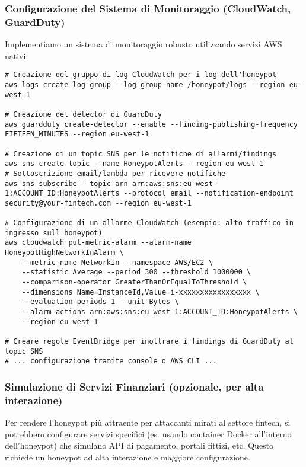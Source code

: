 \subsubsection{Configurazione del Sistema di Monitoraggio (CloudWatch, GuardDuty)}
\label{subsubsec:config_monitoraggio}

Implementiamo un sistema di monitoraggio robusto utilizzando servizi AWS nativi.

\begin{lstlisting}[caption={Configurazione (esemplificativa) del monitoraggio AWS}, label=lst:monitoring_setup]
# Creazione del gruppo di log CloudWatch per i log dell'honeypot
aws logs create-log-group --log-group-name /honeypot/logs --region eu-west-1

# Creazione del detector di GuardDuty
aws guardduty create-detector --enable --finding-publishing-frequency FIFTEEN_MINUTES --region eu-west-1

# Creazione di un topic SNS per le notifiche di allarmi/findings
aws sns create-topic --name HoneypotAlerts --region eu-west-1
# Sottoscrizione email/lambda per ricevere notifiche
aws sns subscribe --topic-arn arn:aws:sns:eu-west-1:ACCOUNT_ID:HoneypotAlerts --protocol email --notification-endpoint security@your-fintech.com --region eu-west-1

# Configurazione di un allarme CloudWatch (esempio: alto traffico in ingresso sull'honeypot)
aws cloudwatch put-metric-alarm --alarm-name HoneypotHighNetworkInAlarm \
    --metric-name NetworkIn --namespace AWS/EC2 \
    --statistic Average --period 300 --threshold 1000000 \
    --comparison-operator GreaterThanOrEqualToThreshold \
    --dimensions Name=InstanceId,Value=i-xxxxxxxxxxxxxxxxx \
    --evaluation-periods 1 --unit Bytes \
    --alarm-actions arn:aws:sns:eu-west-1:ACCOUNT_ID:HoneypotAlerts \
    --region eu-west-1

# Creare regole EventBridge per inoltrare i findings di GuardDuty al topic SNS
# ... configurazione tramite console o AWS CLI ...
\end{lstlisting}

\subsubsection{Simulazione di Servizi Finanziari (opzionale, per alta interazione)}
\label{subsubsec:sim_servizi}

Per rendere l'honeypot più attraente per attaccanti mirati al settore fintech, si potrebbero configurare servizi specifici (es. usando container Docker all'interno dell'honeypot) che simulano API di pagamento, portali fittizi, etc. Questo richiede un honeypot ad alta interazione e maggiore configurazione.

